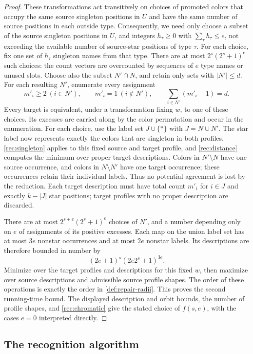 \documentclass[10pt,a4paper]{amsart}
\numberwithin{equation}{section}
\theoremstyle{definition}
\theoremstyle{remark}
\begin{document}
\begin{proof}
These transformations act transitively on choices of promoted colors
that occupy the same source singleton positions in $U$ and have the
same number of source positions in each outside type. Consequently,
we need only choose a subset of the source singleton positions in
$U$, and integers $h_\tau\geq0$ with $\sum_\tau h_\tau\leq e$,
not exceeding the available number of source-star positions of type
$\tau$. For each choice, fix one set of $h_\tau$ singleton
names from that type. There are at most
$2^s(2^s+1)^e$ such choices: the count vectors are overcounted
by sequences of $e$ type names or unused slots.
Choose also the subset $N'\cap N$, and retain only sets with
$|N'|\leq d$. For each resulting $N'$, enumerate every assignment
\[
m'_i\geq2\ (i\in N'),\qquad m'_i=1\ (i\notin N'),\qquad
\sum_{i\in N'}(m'_i-1)=d.
\]
Every target is equivalent, under a transformation fixing $w$,
to one of these choices. Its excesses are carried along by the
color permutation and occur in the enumeration. For each choice, use the
label set $J\cup\{*\}$ with $J=N\cup N'$. The star label now
represents exactly the colors that are singleton in both profiles.
\cref{rec:singleton} applies to this fixed source and target
profile, and \cref{rec:distance} computes the minimum over
proper target descriptions. Colors in $N'\setminus N$ have one
source occurrence, and colors in $N\setminus N'$ have one target
occurrence; these occurrences retain their individual labels.
Thus no potential agreement is lost by the reduction. Each target
description must have total count $m'_i$ for $i\in J$ and exactly
$k-|J|$ star positions; target profiles with no proper description
are discarded.

There are at most $2^{s+e}(2^s+1)^e$ choices of $N'$, and a number
depending only on $e$ of assignments of its positive excesses.
Each map on the union label set has at most $3e$ nonstar
occurrences and at most $2e$ nonstar labels. Its descriptions are
therefore bounded in number by
\[
(2e+1)^s(2e2^s+1)^{3e}.
\]
Minimize over the target profiles and descriptions for this fixed
$w$, then maximize over source descriptions and admissible source
profile shapes. The order of these operations is exactly the
order in \cref{def:repair-radii}. This proves the second
running-time bound. The displayed description and orbit bounds, the number
of profile shapes, and \cref{rec:chromatic} give the stated
choice of $f(s,e)$, with the cases $e=0$ interpreted directly.
\end{proof}

\subsection{The recognition algorithm}
\end{document}
